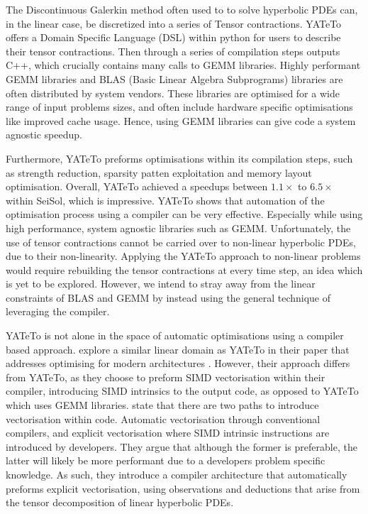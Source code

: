 The Discontinuous Galerkin method often used to to solve hyperbolic PDEs can, in the linear case, be discretized into a series of Tensor contractions.
YATeTo offers a Domain Specific Language (DSL) within python for users to describe their tensor contractions.
Then through a series of compilation steps outputs C++, which crucially contains many calls to GEMM libraries.
Highly performant GEMM libraries and BLAS (Basic Linear Algebra Subprograms) libraries are often distributed by system vendors.
These libraries are optimised for a wide range of input problems sizes, and often include hardware specific optimisations like improved cache usage.
Hence, using GEMM libraries can give code a system agnostic speedup.

Furthermore, YATeTo preforms optimisations within its compilation steps, such as strength reduction, sparsity patten exploitation and memory layout optimisation.
Overall, YATeTo achieved a speedups between $1.1\times$ to $6.5 \times$ within SeiSol, which is impressive.
YATeTo shows that automation of the optimisation process using a compiler can be very effective.
Especially while using high performance, system agnostic libraries such as GEMM.
Unfortunately, the use of tensor contractions cannot be carried over to non-linear hyperbolic PDEs, due to their non-linearity.
Applying the YATeTo approach to non-linear problems would require rebuilding the tensor contractions at every time step, an idea which is yet to be explored.
However, we intend to stray away from the linear constraints of BLAS and GEMM by instead using the general technique of leveraging the compiler.   





YATeTo is not alone in the space of automatic optimisations using a compiler based approach.
\citeauthor{codegen_dg_SIMD} explore a similar linear domain as YATeTo in their paper that addresses optimising for modern architectures \cite{codegen_dg_SIMD}. 
However, their approach differs from YATeTo, as they choose to preform SIMD vectorisation within their compiler, introducing SIMD intrinsics to the output code, as opposed to YATeTo which uses GEMM libraries.
\citeauthor{codegen_dg_SIMD} state that there are two paths to introduce vectorisation within code.
Automatic vectorisation through conventional compilers, and explicit vectorisation where SIMD intrinsic instructions are introduced by developers.
They argue that although the former is preferable, the latter will likely be more performant due to a developers problem specific knowledge.
As such, they introduce a compiler architecture that automatically preforms explicit vectorisation, using observations and deductions that arise from the tensor decomposition of linear hyperbolic PDEs.

